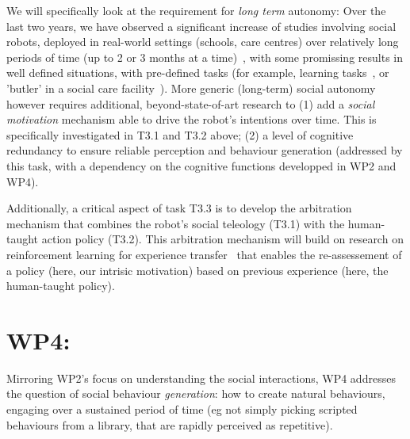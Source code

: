 \documentclass[11pt,a4paper]{report}
\begin{document}
We will specifically look at the requirement for \emph{long term} autonomy: Over
the last two years, we have observed a significant increase of studies
involving social robots, deployed in real-world settings (schools, care centres)
over relatively long periods of time (up to 2 or 3 months at a
time)~\cite{kunze2018artificial,leite2013social}, with some promissing results
in well defined situations, with pre-defined tasks (for example, learning
tasks~\cite{senft2019teaching}, or 'butler' in a social care
facility~\cite{hawes2017strands}). More generic (long-term) social autonomy
however requires additional, beyond-state-of-art research to (1) add a
\emph{social motivation} mechanism able to drive the robot's intentions over
time. This is specifically investigated in T3.1 and T3.2 above; (2) a level of
cognitive redundancy to ensure reliable perception and behaviour generation
(addressed by this task, with a dependency on the cognitive functions developped
in WP2 and WP4).

Additionally, a critical aspect of task T3.3 is to develop the arbitration
mechanism that combines the robot's social teleology (T3.1) with the human-taught
action policy (T3.2). This arbitration mechanism will build on research on
reinforcement learning for experience transfer~\cite{madden2004transfer} that
enables the re-assessement of a policy (here, our intrisic motivation) based on
previous experience (here, the human-taught policy).




\section{WP4: \textbf{\wpFour}} 

\noindent{}

Mirroring WP2's focus on understanding the social interactions, WP4 addresses the
question of social behaviour \emph{generation}: how to create natural
behaviours, engaging over a sustained period of time (eg not simply picking
scripted behaviours from a library, that are rapidly perceived as repetitive).
\end{document}
